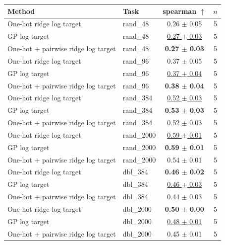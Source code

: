 \begin{tabular}{llcc}
\toprule
Method & Task & spearman $\uparrow$ & $n$ \\
\midrule
One-hot ridge log target & rand\_48 & 0.26 $\pm$ 0.05 & 5 \\
GP log target & rand\_48 & \underline{0.27 $\pm$ 0.03} & 5 \\
One-hot + pairwise ridge log target & rand\_48 & \textbf{0.27 $\pm$ 0.03} & 5 \\
\midrule
One-hot ridge log target & rand\_96 & 0.37 $\pm$ 0.05 & 5 \\
GP log target & rand\_96 & \underline{0.37 $\pm$ 0.04} & 5 \\
One-hot + pairwise ridge log target & rand\_96 & \textbf{0.38 $\pm$ 0.04} & 5 \\
\midrule
One-hot ridge log target & rand\_384 & \underline{0.52 $\pm$ 0.03} & 5 \\
GP log target & rand\_384 & \textbf{0.53 $\pm$ 0.03} & 5 \\
One-hot + pairwise ridge log target & rand\_384 & 0.52 $\pm$ 0.03 & 5 \\
\midrule
One-hot ridge log target & rand\_2000 & \underline{0.59 $\pm$ 0.01} & 5 \\
GP log target & rand\_2000 & \textbf{0.59 $\pm$ 0.01} & 5 \\
One-hot + pairwise ridge log target & rand\_2000 & 0.54 $\pm$ 0.01 & 5 \\
\midrule
One-hot ridge log target & dbl\_384 & \textbf{0.46 $\pm$ 0.02} & 5 \\
GP log target & dbl\_384 & \underline{0.46 $\pm$ 0.03} & 5 \\
One-hot + pairwise ridge log target & dbl\_384 & 0.44 $\pm$ 0.03 & 5 \\
\midrule
One-hot ridge log target & dbl\_2000 & \textbf{0.50 $\pm$ 0.00} & 5 \\
GP log target & dbl\_2000 & \underline{0.48 $\pm$ 0.01} & 5 \\
One-hot + pairwise ridge log target & dbl\_2000 & 0.45 $\pm$ 0.01 & 5 \\
\bottomrule
\end{tabular}
